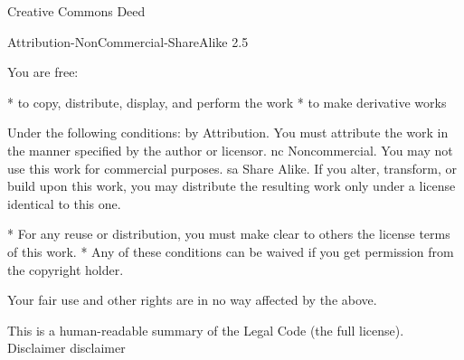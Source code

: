 
Creative Commons Deed

Attribution-NonCommercial-ShareAlike 2.5

You are free:

    * to copy, distribute, display, and perform the work
    * to make derivative works

Under the following conditions:
by 	
Attribution. You must attribute the work in the manner specified by the author or licensor.
nc 	
Noncommercial. You may not use this work for commercial purposes.
sa 	
Share Alike. If you alter, transform, or build upon this work, you may distribute the resulting work only under a license identical to this one.

    * For any reuse or distribution, you must make clear to others the license terms of this work.
    * Any of these conditions can be waived if you get permission from the copyright holder.

Your fair use and other rights are in no way affected by the above.

This is a human-readable summary of the Legal Code (the full license).
Disclaimer disclaimer